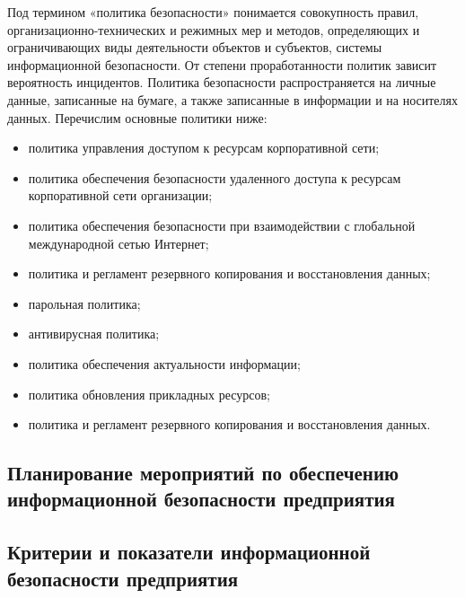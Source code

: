 Под термином «политика безопасности» понимается совокупность
правил, организационно-технических и режимных мер и методов,
определяющих и ограничивающих виды деятельности объектов и субъектов,
системы информационной безопасности. От степени проработанности
политик зависит вероятность инцидентов.
Политика безопасности распространяется на личные данные,
записанные на бумаге, а также записанные в информации и на носителях
данных.
Перечислим основные политики ниже:
\begin{itemize}
	\item политика управления доступом к ресурсам корпоративной сети;
	\item политика обеспечения безопасности удаленного доступа к ресурсам корпоративной сети организации;
	\item политика обеспечения безопасности при взаимодействии с глобальной международной сетью Интернет;
	\item политика и регламент резервного копирования и восстановления данных;
	\item парольная политика;
	\item антивирусная политика;
	\item политика обеспечения актуальности информации;
	\item политика обновления прикладных ресурсов;
	\item политика и регламент резервного копирования и восстановления
данных.
\end{itemize}

\subsection{Планирование мероприятий по обеспечению информационной безопасности предприятия}
\label{subsec:mechanisms:planning}

\subsection{Критерии и показатели информационной безопасности предприятия}
\label{subsec:mechanisms:indicators}

